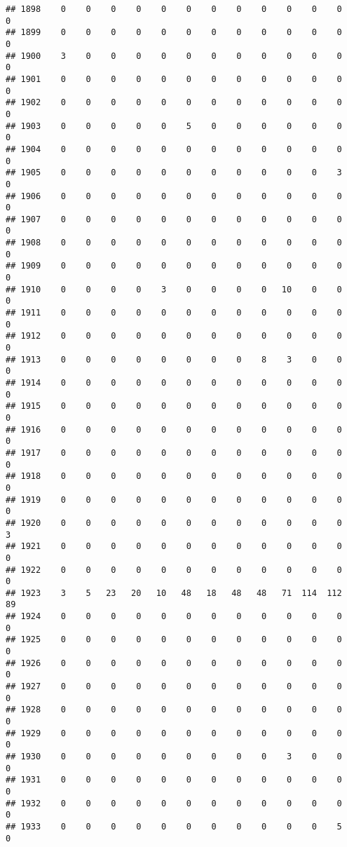 \documentclass[]{article}
\begin{document}
\begin{verbatim}
## 1898    0    0    0    0    0    0    0    0    0    0    0    0    0
## 1899    0    0    0    0    0    0    0    0    0    0    0    0    0
## 1900    3    0    0    0    0    0    0    0    0    0    0    0    0
## 1901    0    0    0    0    0    0    0    0    0    0    0    0    0
## 1902    0    0    0    0    0    0    0    0    0    0    0    0    0
## 1903    0    0    0    0    0    5    0    0    0    0    0    0    0
## 1904    0    0    0    0    0    0    0    0    0    0    0    0    0
## 1905    0    0    0    0    0    0    0    0    0    0    0    3    0
## 1906    0    0    0    0    0    0    0    0    0    0    0    0    0
## 1907    0    0    0    0    0    0    0    0    0    0    0    0    0
## 1908    0    0    0    0    0    0    0    0    0    0    0    0    0
## 1909    0    0    0    0    0    0    0    0    0    0    0    0    0
## 1910    0    0    0    0    3    0    0    0    0   10    0    0    0
## 1911    0    0    0    0    0    0    0    0    0    0    0    0    0
## 1912    0    0    0    0    0    0    0    0    0    0    0    0    0
## 1913    0    0    0    0    0    0    0    0    8    3    0    0    0
## 1914    0    0    0    0    0    0    0    0    0    0    0    0    0
## 1915    0    0    0    0    0    0    0    0    0    0    0    0    0
## 1916    0    0    0    0    0    0    0    0    0    0    0    0    0
## 1917    0    0    0    0    0    0    0    0    0    0    0    0    0
## 1918    0    0    0    0    0    0    0    0    0    0    0    0    0
## 1919    0    0    0    0    0    0    0    0    0    0    0    0    0
## 1920    0    0    0    0    0    0    0    0    0    0    0    0    3
## 1921    0    0    0    0    0    0    0    0    0    0    0    0    0
## 1922    0    0    0    0    0    0    0    0    0    0    0    0    0
## 1923    3    5   23   20   10   48   18   48   48   71  114  112   89
## 1924    0    0    0    0    0    0    0    0    0    0    0    0    0
## 1925    0    0    0    0    0    0    0    0    0    0    0    0    0
## 1926    0    0    0    0    0    0    0    0    0    0    0    0    0
## 1927    0    0    0    0    0    0    0    0    0    0    0    0    0
## 1928    0    0    0    0    0    0    0    0    0    0    0    0    0
## 1929    0    0    0    0    0    0    0    0    0    0    0    0    0
## 1930    0    0    0    0    0    0    0    0    0    3    0    0    0
## 1931    0    0    0    0    0    0    0    0    0    0    0    0    0
## 1932    0    0    0    0    0    0    0    0    0    0    0    0    0
## 1933    0    0    0    0    0    0    0    0    0    0    0    5    0

\end{verbatim}
\end{document}
